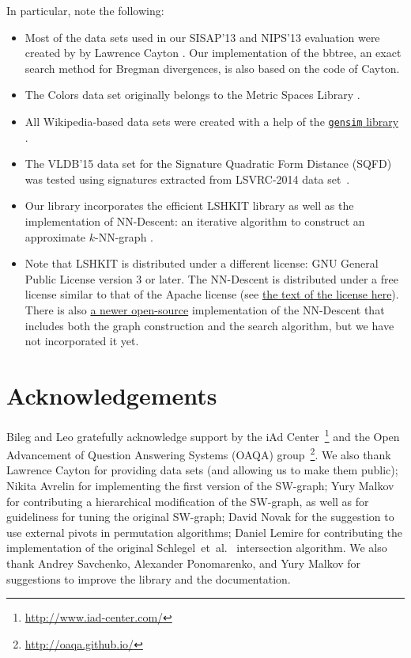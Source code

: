 \documentclass[runningheads,a4paper]{llncs}
\newcommand{\ttt}[1]{\texttt{#1}}
\newcommand{\knnns}{$k$-NN}
\begin{document}
In particular, note the following:
\begin{itemize}
\item Most of the data sets used in our SISAP'13 and NIPS'13
evaluation were created by  by Lawrence Cayton \cite{Cayton2008}.
Our implementation of the bbtree, 
an exact search method for Bregman divergences,
is also based on the code of Cayton.

\item The Colors data set originally belongs to the Metric Spaces Library \cite{LibMetricSpace}.

\item All Wikipedia-based data sets were created with a help of the \href{https://github.com/piskvorky/gensim/}{\ttt{gensim} library} \cite{rehurek_lrec}.

\item The VLDB'15 data set for the Signature Quadratic Form Distance (SQFD) \cite{Beecks:2010,Beecks:2013} 
was tested using signatures extracted from LSVRC-2014 data set~\cite{ILSVRCarxiv14}. 

\item Our library incorporates the efficient LSHKIT library
as well as the implementation of NN-Descent: 
an iterative algorithm to construct an approximate \knnns-graph \cite{dong2011efficient}.

\item Note that LSHKIT is distributed under a different license: 
GNU General Public License version 3 or later. 
The NN-Descent is distributed under a free license similar to
that of the Apache license (see \href{https://code.google.com/p/nndes/source/browse/trunk/LICENSE}{the 
text of the license here}). There is also \href{http://kgraph.org}{a newer open-source}
implementation of the NN-Descent that includes both
the graph construction and the search algorithm, but we have not incorporated it yet.

\end{itemize}

\section{Acknowledgements}
Bileg and Leo gratefully acknowledge support by the iAd Center~\footnote{\url{http://www.iad-center.com/}}
and the Open Advancement of Question Answering Systems (OAQA) group~\footnote{\url{http://oaqa.github.io/}}.
We also thank 
Lawrence Cayton for providing data sets (and allowing us to make them public);
Nikita Avrelin for implementing the first version of the SW-graph;
Yury Malkov for contributing a hierarchical modification of the SW-graph, 
as well as for guideliness for tuning the original SW-graph;
David Novak for the suggestion to use external pivots in permutation algorithms;
Daniel Lemire for contributing the implementation of the original Schlegel~et~al.~\cite{schlegel2011fast}
intersection algorithm.
We also thank Andrey Savchenko, Alexander Ponomarenko, and Yury Malkov
for suggestions to improve the library and the documentation.
\end{document}
